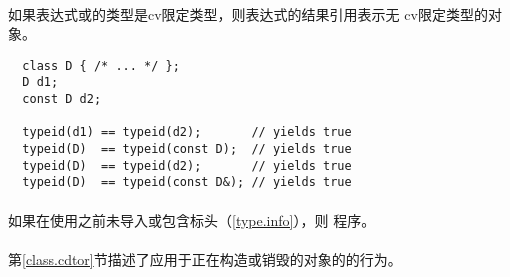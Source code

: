 \paragraph{} %
如果表达式或的类型是cv限定类型，则表达式的结果引用表示无
cv限定类型的对象。

\begin{example}
  \begin{lstlisting}
  class D { /* ... */ };
  D d1;
  const D d2;

  typeid(d1) == typeid(d2);       // yields true
  typeid(D)  == typeid(const D);  // yields true
  typeid(D)  == typeid(d2);       // yields true
  typeid(D)  == typeid(const D&); // yields true
  \end{lstlisting}
\end{example}

\paragraph{} %
如果在使用之前未导入或包含标头（\ref{type.info}），则
程序\illform{}。

\paragraph{} %
\begin{note}
  第\ref{class.cdtor}节描述了应用于正在构造或销毁的对象的的行为。
\end{note}
